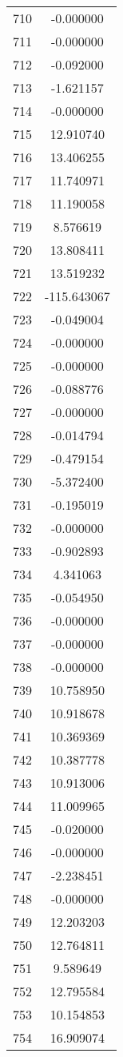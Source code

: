 \documentclass[12pt]{article}
\begin{document}
\begin{longtable}{@{}cc@{}}
710 & -0.000000 \\
711 & -0.000000 \\
712 & -0.092000 \\
713 & -1.621157 \\
714 & -0.000000 \\
715 & 12.910740 \\
716 & 13.406255 \\
717 & 11.740971 \\
718 & 11.190058 \\
719 & 8.576619 \\
720 & 13.808411 \\
721 & 13.519232 \\
722 & -115.643067 \\
723 & -0.049004 \\
724 & -0.000000 \\
725 & -0.000000 \\
726 & -0.088776 \\
727 & -0.000000 \\
728 & -0.014794 \\
729 & -0.479154 \\
730 & -5.372400 \\
731 & -0.195019 \\
732 & -0.000000 \\
733 & -0.902893 \\
734 & 4.341063 \\
735 & -0.054950 \\
736 & -0.000000 \\
737 & -0.000000 \\
738 & -0.000000 \\
739 & 10.758950 \\
740 & 10.918678 \\
741 & 10.369369 \\
742 & 10.387778 \\
743 & 10.913006 \\
744 & 11.009965 \\
745 & -0.020000 \\
746 & -0.000000 \\
747 & -2.238451 \\
748 & -0.000000 \\
749 & 12.203203 \\
750 & 12.764811 \\
751 & 9.589649 \\
752 & 12.795584 \\
753 & 10.154853 \\
754 & 16.909074 \\

\end{longtable}
\end{document}
